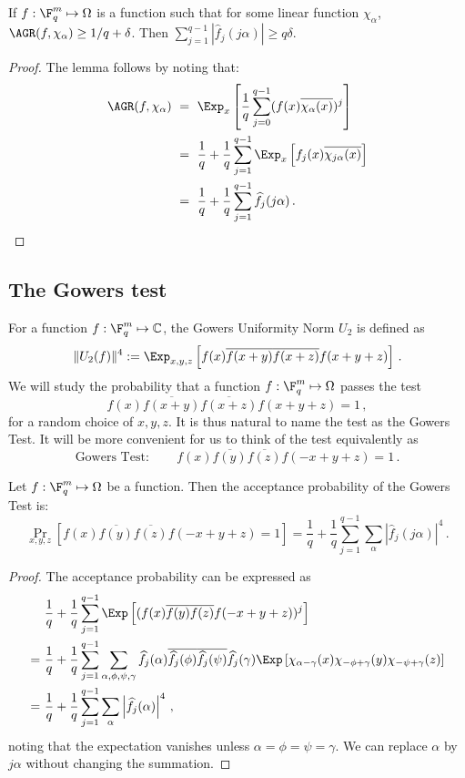 \begin{lemma}\label{lemma:agr} If $f: \F_q^m \mapsto \Omega$ is a function such that for some
linear function $\chi_\alpha$, $\AGR(f, \chi_\alpha) \geq {1}/{q}+\delta$. Then
$\sum_{j=1}^{q-1} \left| \widehat{f}_{j}(j \alpha) \right| \geq q\delta$.
\end{lemma}
\begin{proof} The lemma follows by noting that:
\begin{align*}
\AGR(f, \chi_\alpha)\ &=\  \Exp_x \left[  \frac{1}{q} \sum_{j=0}^{q-1} (f(x) \overline{\chi_\alpha(x)})^j   \right] \\
 &=\   \frac{1}{q} + \frac{1}{q} \sum_{j=1}^{q-1} \Exp_x \left[ f_j(x) \overline{\chi_{j \alpha}(x)}   \right] \\
 &=\  \frac{1}{q} + \frac{1}{q}  \sum_{j=1}^{q-1} \widehat{f}_j (j \alpha)\,.\qedhere
\end{align*}
\end{proof}

\subsection{The Gowers test}\label{sec:gowers-test}

For a function $f: \F_q^m \mapsto {\mathbb C}$, the Gowers Uniformity Norm $U_2$ \cite{Gowers} is defined as
 $$ \| U_2(f) \|^4 := \Exp_{x,y,z} \left[ f(x) \overline{f(x+y)}\overline{f(x+z)} f(x+y+z)   \right]\,. $$
We will study the probability that a function $f: \F_q^m \mapsto \Omega$ passes the test
$$f(x) \overline{f(x+y)}\overline{f(x+z)} f(x+y+z) =1\,,$$
for a random choice of $x,y,z$. It is thus natural to name the test as the Gowers Test.
It will be more convenient for us to think of the test equivalently
as $$\mbox{Gowers Test}: \quad\quad f(x) \overline{f(y)}\overline{f(z)} f(-x+y+z) =1\,.$$

\begin{lemma} Let $f: \F_q^m \mapsto \Omega$ be a function. Then the acceptance probability of the Gowers Test is:
$$ \Pr_{x,y,z} \left[f(x) \overline{f(y)}\overline{f(z)} f(-x+y+z) =1 \right]
   = \frac{1}{q} + \frac{1}{q} \sum_{j=1}^{q-1} \sum_\alpha  \left| \widehat{f}_j (j\alpha)\right|^4\,.   $$
\end{lemma}
\begin{proof} The acceptance probability can be expressed as
\begin{align*}
   &  \frac{1}{q} + \frac{1}{q} \sum_{j=1}^{q-1} \Exp \left[ (f(x) \overline{f(y)}\overline{f(z)} f(-x+y+z))^j   \right] \\
  =\ & \frac{1}{q} + \frac{1}{q}  \sum_{j=1}^{q-1} \sum_{\alpha, \phi, \psi, \gamma}
 \widehat{f_j}(\alpha) \overline{\widehat{f_j}(\phi)} \overline{\widehat{f_j}(\psi)}\widehat{f_j}(\gamma)
  \Exp \left[ \chi_{\alpha - \gamma}(x) \chi_{-\phi + \gamma}(y) \chi_{-\psi + \gamma}(z)    \right] \\
  =\ &  \frac{1}{q} + \frac{1}{q}  \sum_{j=1}^{q-1} \sum_\alpha \left| \widehat{f}_j (\alpha)\right|^4\,,
\end{align*}
noting that the expectation vanishes unless $\alpha = \phi = \psi = \gamma$. We can replace
$\alpha$ by $j \alpha$ without changing the summation.
\end{proof}

